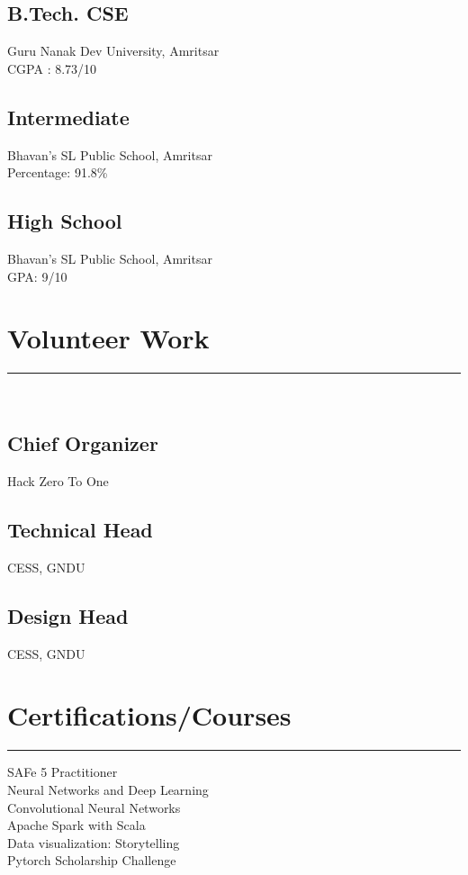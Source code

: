\documentclass[]{puneet-resume}
\begin{document}
\begin{minipage}[t]{0.33\textwidth}
\subsection{B.Tech. CSE}
Guru Nanak Dev University, Amritsar\\
CGPA : 8.73/10\\
\vspace{8pt}
\subsection{Intermediate}
Bhavan's SL Public School, Amritsar\\
Percentage: 91.8\%\\
\vspace{8pt}
\subsection{High School}
Bhavan's SL Public School, Amritsar\\
GPA: 9/10
\sectionsep
\section{Volunteer Work} 
\noindent\rule{5cm}{0.4pt}\\
\subsection{Chief Organizer}
Hack Zero To One\\
\vspace{8pt}
\subsection{Technical Head}
CESS, GNDU\\
\vspace{8pt}
\subsection{Design Head}
CESS, GNDU\\
\sectionsep
\section{Certifications/Courses}
\noindent\rule{5cm}{0.4pt}

SAFe 5 Practitioner\\
Neural Networks and Deep Learning\\
Convolutional Neural Networks\\
Apache Spark with Scala\\
Data visualization: Storytelling\\
Pytorch Scholarship Challenge
\sectionsep
%
%

\end{minipage} 
\end{document}
